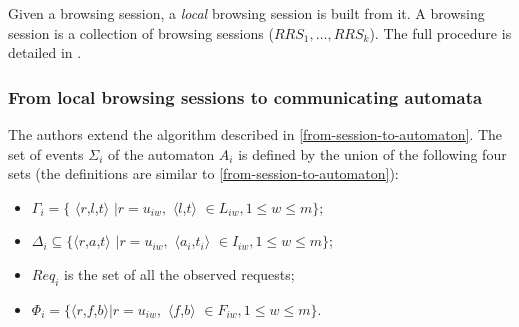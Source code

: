\documentclass[a4paper,10pt]{article}
\newcommand{\tuple}[1]{\mbox{$\langle$#1$\rangle$}}
\theoremstyle{plain} %
\theoremstyle{definition}
\theoremstyle{remark}
\begin{document}
Given a browsing session, a \emph{local} browsing session is built from it. A  browsing session is a collection of browsing sessions ($RRS_1,\dots,RRS_k$). The full procedure is detailed in \cite{Haydar2004}.

\subsubsection{From local browsing sessions to communicating automata}

The authors extend the algorithm described in \cref{from-session-to-automaton}. The set of events $\Sigma_i$ of the automaton $A_i$ is defined by the union of the following four sets (the definitions are similar to \cref{from-session-to-automaton}):


\begin{itemize}
  \item $\Gamma_i =\{$ \tuple{$r$,$l$,$t$} $\mid r=u_{iw},$ \tuple{$l$,$t$} $\in L_{iw}, 1 \leq w \leq m\}$;
  \item $\Delta_i \subseteq \{$\tuple{$r$,$a$,$t$} $\mid r=u_{iw},$ \tuple{$a_i$,$t_i$} $\in I_{iw}, 1\leq w \leq m\}$;
  \item $Req_i$ is the set of all the observed requests;
  \item $\Phi_i = \{$\tuple{$r$,$f$,$b$}$\mid r=u_{iw},$ \tuple{$f$,$b$} $\in F_{iw}, 1\leq w \leq m\}$.
\end{itemize}
\end{document}
